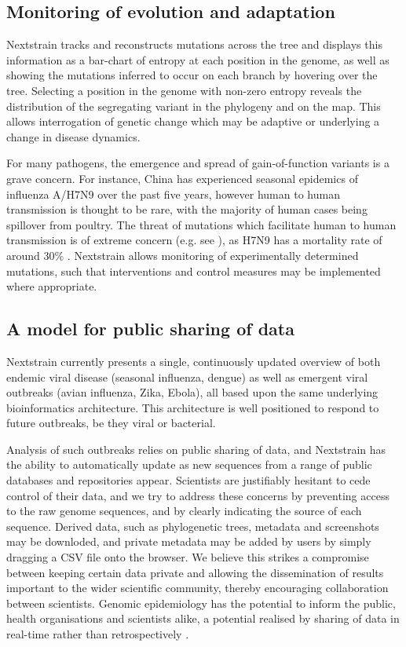 \documentclass{bioinfo}
\begin{document}
\subsection*{Monitoring of evolution and adaptation}
Nextstrain tracks and reconstructs mutations across the tree and displays this information as a bar-chart of entropy at each position in the genome, as well as showing the mutations inferred to occur on each branch by hovering over the tree.
Selecting a position in the genome with non-zero entropy reveals the distribution of the segregating variant in the phylogeny and on the map.
This allows interrogation of genetic change which may be adaptive or underlying a change in disease dynamics.

For many pathogens, the emergence and spread of gain-of-function variants is a grave concern.
For instance, China has experienced seasonal epidemics of influenza A/H7N9 over the past five years, however human to human transmission is thought to be rare, with the majority of human cases being spillover from poultry.
The threat of mutations which facilitate human to human transmission is of extreme concern (e.g. see \citep{deVries2017}), as H7N9 has a mortality rate of around $30\%$ \citep{li2014epidemiology}.
Nextstrain allows monitoring of experimentally determined mutations, such that interventions and control measures may be implemented where appropriate.

\subsection*{A model for public sharing of data}
Nextstrain currently presents a single, continuously updated overview of both endemic viral disease (seasonal influenza, dengue) as well as emergent viral outbreaks (avian influenza, Zika, Ebola), all based upon the same underlying bioinformatics architecture.
This architecture is well positioned to respond to future outbreaks, be they viral or bacterial.

Analysis of such outbreaks relies on public sharing of data, and Nextstrain has the ability to automatically update as new sequences from a range of public databases and repositories appear.
Scientists are justifiably hesitant to cede control of their data, and we try to address these concerns by preventing access to the raw genome sequences, and by clearly indicating the source of each sequence.
Derived data, such as phylogenetic trees, metadata and screenshots may be downloded, and private metadata may be added by users by simply dragging a CSV file onto the browser.
We believe this strikes a compromise between keeping certain data private and allowing the dissemination of results important to the wider scientific community, thereby encouraging collaboration between scientists.
Genomic epidemiology has the potential to inform the public, health organisations and scientists alike, a potential realised by sharing of data in real-time rather than retrospectively \citep{croucher2015application}.
\end{document}
